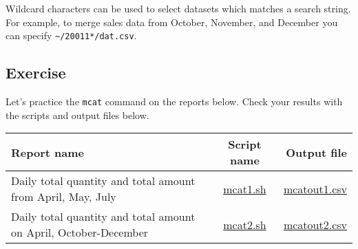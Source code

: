 Wildcard characters can be used to select datasets which matches a search string.  For example, to merge sales data from October, November, and December you can specify \verb|~/20011*/dat.csv|.\\


\subsection{Exercise }

Let's practice the \verb|mcat| command on the reports below. Check your results with the scripts and output files below. 

\begin{table}[htbp]
{\small
\begin{tabular}{ l | c || r }
\hline
\textbf{Report name}   & \textbf{Script name} & \textbf{Output file}  \\
\hline
Daily total quantity and total amount from April, May, July & \href{exercise/mcat1.sh}{mcat1.sh} & \href{exercise/outdat/mcatout1.csv}{mcatout1.csv} \\
Daily total quantity and total amount on April, October-December & \href{exercise/mcat2.sh}{mcat2.sh} & \href{exercise/outdat/mcatout2.csv}{mcatout2.csv} \\

\hline
\end{tabular} 
}
\end{table} 


%
